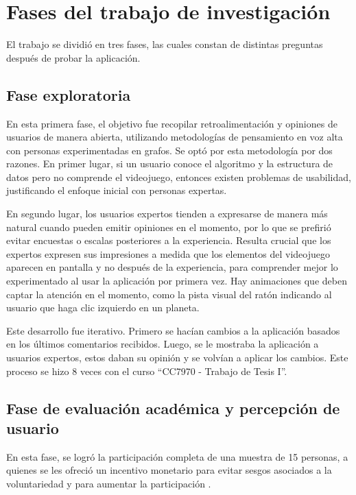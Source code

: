 \section{Fases del trabajo de investigación}

El trabajo se dividió en tres fases, las cuales constan de distintas preguntas después de probar la aplicación.


\subsection{Fase exploratoria}

En esta primera fase, el objetivo fue recopilar retroalimentación y opiniones de usuarios de manera abierta, utilizando metodologías de pensamiento en voz alta con personas experimentadas en grafos. Se optó por esta metodología por dos razones. En primer lugar, si un usuario conoce el algoritmo y la estructura de datos pero no comprende el videojuego, entonces existen problemas de usabilidad, justificando el enfoque inicial con personas expertas.

En segundo lugar, los usuarios expertos tienden a expresarse de manera más natural cuando pueden emitir opiniones en el momento, por lo que se prefirió evitar encuestas o escalas posteriores a la experiencia. Resulta crucial que los expertos expresen sus impresiones a medida que los elementos del videojuego aparecen en pantalla y no después de la experiencia, para comprender mejor lo experimentado al usar la aplicación por primera vez. Hay animaciones que deben captar la atención en el momento, como la pista visual del ratón indicando al usuario que haga clic izquierdo en un planeta.

Este desarrollo fue iterativo. Primero se hacían cambios a la aplicación basados en los últimos comentarios recibidos. Luego, se le mostraba la aplicación a usuarios expertos, estos daban su opinión y se volvían a aplicar los cambios. Este proceso se hizo 8 veces con el curso ``CC7970 - Trabajo de Tesis I''.


\subsection{Fase de evaluación académica y percepción de usuario}

En esta fase, se logró la participación completa de una muestra de 15 personas, a quienes se les ofreció un incentivo monetario para evitar sesgos asociados a la voluntariedad y para aumentar la participación \cite{Marinescu2018IncentivesCR, Dallmeyer2023ToPayOrNot}.

